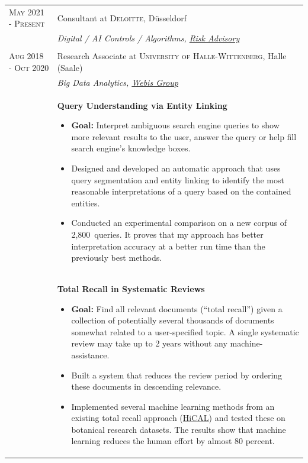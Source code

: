 \documentclass[a4paper,10pt]{article} %
\begin{document}
\begin{longtable}{l p{11cm}}
\textsc{May 2021 - Present} & Consultant at \textsc{Deloitte}, Düsseldorf\\
& \emph{Digital / AI Controls / Algorithms, \href{https://www2.deloitte.com/de/de/services/risk.html?icid=bottom_risk}{Risk Advisory}}\\
\multicolumn{2}{c}{} \\

\textsc{Aug 2018 - Oct 2020} & Research Associate at \textsc{University of Halle-Wittenberg}, Halle (Saale)
\\
& \emph{Big Data Analytics, \href{https://webis.de}{Webis Group}}\\[1mm]
& \textbf{\footnotesize{Query Understanding via Entity Linking}}\vspace{0.2em}
  {\footnotesize
  	\begin{itemize}
  		\setlength\itemsep{0.2em}
 		\item \textbf{Goal:} Interpret ambiguous search engine queries to show more relevant results to the user, answer the query or help fill search engine's knowledge boxes. 
 		\item Designed and developed an automatic approach that uses query segmentation and entity linking to identify the most reasonable interpretations of a query based on the contained entities. 
		\item Conducted an experimental comparison on a new corpus of 2,800~queries. It proves that my approach has better interpretation accuracy at a better run time than the previously best methods.    
  \end{itemize}
  }
\\[-2mm]
& \textbf{\footnotesize{Total Recall in Systematic Reviews}}\vspace{0.2em}
  {\footnotesize
  	\begin{itemize}
  		\setlength\itemsep{0.2em}
 		\item \textbf{Goal:} Find all relevant documents (“total recall”) given a collection of potentially several thousands of documents somewhat related to a user-specified topic. A single systematic review may take up to 2 years without any machine-assistance. 
 		\item Built a system that reduces the review period by ordering these documents in descending relevance. 
 		\item Implemented several machine learning methods from an existing total recall approach (\href{https://github.com/hical/HiCAL}{HiCAL}) and tested these on botanical research datasets. The results show that machine learning reduces the human effort by almost 80 percent. 

\end{itemize}}
\end{longtable}
\end{document}
